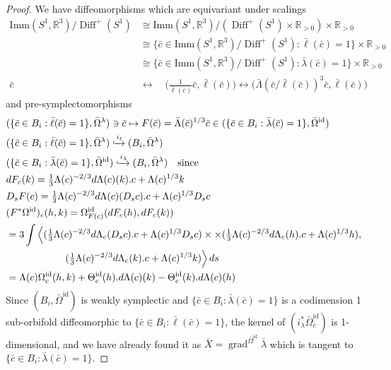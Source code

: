 \documentclass[12pt]{amsart}
\newcommand{\rev}[1]{#1}
\theoremstyle{definition}
\newcommand{\Diffp}{\operatorname{Diff}^+(S^1)}
\newcommand{\id}{\mathrm{id}}
\newcommand{\Imm}{\mathrm{Imm}}
\def\la{\lambda}
\def\Th{\Theta}
\def\La{\Lambda}
\def\Om{\Omega}
\def\x{\times}
\let\on=\operatorname
\begin{document}
\begin{proof}
    We have   diffeomorphisms which are equivariant under scalings
\begin{align}
    \Imm(S^1,\mathbb R^3)/\Diffp &\cong \Imm(S^1,\mathbb R^3)/(\Diffp\x \mathbb R_{>0})\x \mathbb R_{>0}
    \\&
    \cong \{\bar c\in \Imm(S^1,\mathbb R^3)/\Diffp: \rev{\bar\ell}(\bar c) =1\}\x \mathbb R_{>0}
    \\&
    \cong \{\bar c\in \Imm(S^1,\mathbb R^3)/\Diffp: \rev{\bar\la}(\bar c) =1\}\x \mathbb R_{>0}
    \\
    \bar c\quad &\longleftrightarrow\quad \big(\frac1{\rev{\bar\ell}(\bar c)}\bar c, \rev{\bar\ell}(\bar c)\big)
    \longleftrightarrow \big(\bar\La(\bar c/\rev{\bar \ell(\bar c)})^3\bar c, \rev{\bar\ell}(\bar c)\big)
\end{align}
and pre-symplectomorphisms  
\begin{align}
 &(\{\bar c\in B_i: \rev{\bar\ell}(\bar c) =1\},\bar\Om^\la)\ni \bar c\mapsto F(\bar c)=\rev{\bar\La}(\bar c)^{1/3}\bar c\in (\{\bar c\in B_i: \rev{\bar\la}(\bar c) =1\},\bar\Om^\id)  
 \\
 &(\{\bar c\in B_i: \rev{\bar\ell}(\bar c) =1\},\bar\Om^\la)
 \xhookrightarrow{i_{\ell}} (B_i, \bar \Om^\la)
 \\
 &(\{\bar c\in B_i: \rev{\bar\la}(\bar c) =1\},\bar\Om^\id)
 \xhookrightarrow{i_{\la}} (B_i, \bar \Om^\la)\quad \text{since}
\\
&dF\rev{_c}(k) = \tfrac13\La(c)^{-2/3}d\La(c)(k).c + \La(c)^{1/3} k
\\
&D_s F(c) = \tfrac13\La(c)^{-2/3}d\La(c)(D_sc).c + \La(c)^{1/3} D_sc
\\
&(F^*\Om^\id)_c(h,k) = \Om^\id_{F(c)}(dF\rev{_c}(h),dF\rev{_c}(k))
\\&
= 3\int\Big\langle 
(\tfrac13\La(c)^{-2/3}d\La\rev{_c}(D_sc).c + \La(c)^{1/3} D_sc) \x 
\x (\tfrac13\La(c)^{-2/3}d\La\rev{_c}(h).c + \La(c)^{1/3} h),
\\&\qquad\qquad\qquad
(\tfrac13\La(c)^{-2/3}d\La\rev{_c}(k).c + \La(c)^{1/3} k)
\Big\rangle\,ds
\\&
= \La(c)\Om^\id_c(h,k) +\Th^\id_c(h).d\La(c)(k) - \Th^\id_c(k).d\La(c)(h)
\end{align}
Since $(B_i,\bar\Om^\id)$ is weakly symplectic and  $\{\bar c\in B_i: \bar\la(\bar c) =1\}$ is a codimension 1 sub-orbifold diffeomorphic to $\{\bar c\in B_i: \bar\ell(\bar c) =1\}$, the kernel of $(i_\la^*\bar\Om^\id_{\bar c})$ is 1-dimensional, and we have already found it as $\bar X= \on{grad}^{\bar\Om^\id}\bar\la$ which is tangent to $\{\bar c\in B_i: \bar\la(\bar c) =1\}$.
\end{proof} 
\end{document}

